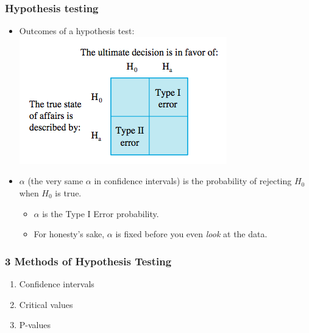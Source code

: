 \documentclass[handout]{beamer}\usepackage{graphicx, color}
\providecommand{\q}{$\quad$ \newline}
\numberwithin{equation}{section}
\begin{document}
\begin{frame}
\frametitle{Hypothesis testing}
\begin{itemize}
\item Outcomes of a hypothesis test: \q
{} \includegraphics{../../fig/typeerrors.png}
\pause \item $\alpha$ (the very same $\alpha$ in confidence intervals) is the probability of rejecting $H_0$ when $H_0$ is true.
\begin{itemize}
\pause \item $\alpha$ is the Type I Error probability.
\pause \item For honesty's sake, $\alpha$ is fixed before you even \emph{look} at the data.
\end{itemize} 
\end{itemize}
\end{frame}

\begin{frame}
\frametitle{3 Methods of Hypothesis Testing}
\begin{enumerate}[1. ]
\item Confidence intervals
\pause \item Critical values
\pause \item P-values
\end{enumerate}
\end{frame}
\end{document}
